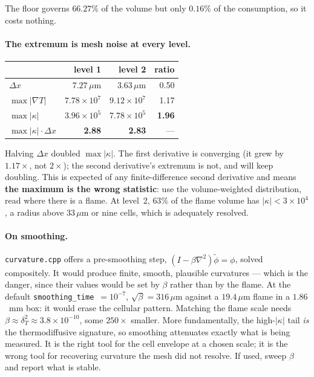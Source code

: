 \documentclass[11pt]{article}
\newcommand{\grad}{\nabla}
\begin{document}
The floor governs $66.27\%$ of the volume but only $0.16\%$ of the
consumption, so it costs nothing.

\paragraph{The extremum is mesh noise at every level.}

\begin{center}
\begin{tabular}{lrrr}
\toprule
 & level 1 & level 2 & ratio \\
\midrule
$\Delta x$ & $7.27\,\mu$m & $3.63\,\mu$m & 0.50 \\
$\max|\grad T|$ & $7.78\times10^{7}$ & $9.12\times10^{7}$ & 1.17 \\
$\max|\kappa|$ & $3.96\times10^{5}$ & $7.78\times10^{5}$ & \textbf{1.96} \\
$\max|\kappa|\cdot\Delta x$ & \textbf{2.88} & \textbf{2.83} & --- \\
\bottomrule
\end{tabular}
\end{center}

Halving $\Delta x$ doubled $\max|\kappa|$. The first derivative is converging
(it grew by $1.17\times$, not $2\times$); the second derivative's extremum is
not, and will keep doubling. This is expected of any finite-difference second
derivative and means \textbf{the maximum is the wrong statistic}: use the
volume-weighted distribution, read where there is a flame. At level~2, $63\%$
of the flame volume has $|\kappa| < 3\times10^{4}$, a radius above $33\,\mu$m
or nine cells, which is adequately resolved.

\paragraph{On smoothing.} \texttt{curvature.cpp} offers a pre-smoothing step,
$(I - \beta\grad^2)\tilde\phi = \phi$, solved compositely. It would produce
finite, smooth, plausible curvatures --- which is the danger, since their
values would be set by $\beta$ rather than by the flame. At the default
\texttt{smoothing\_time}~$=10^{-7}$, $\sqrt{\beta} = 316\,\mu$m against a
$19.4\,\mu$m flame in a $1.86$~mm box: it would erase the cellular pattern.
Matching the flame scale needs $\beta \approx \delta_T^2 \approx
3.8\times10^{-10}$, some $250\times$ smaller. More fundamentally, the
high-$|\kappa|$ tail \emph{is} the thermodiffusive signature, so smoothing
attenuates exactly what is being measured. It is the right tool for the cell
envelope at a chosen scale; it is the wrong tool for recovering curvature the
mesh did not resolve. If used, sweep $\beta$ and report what is stable.
\end{document}
